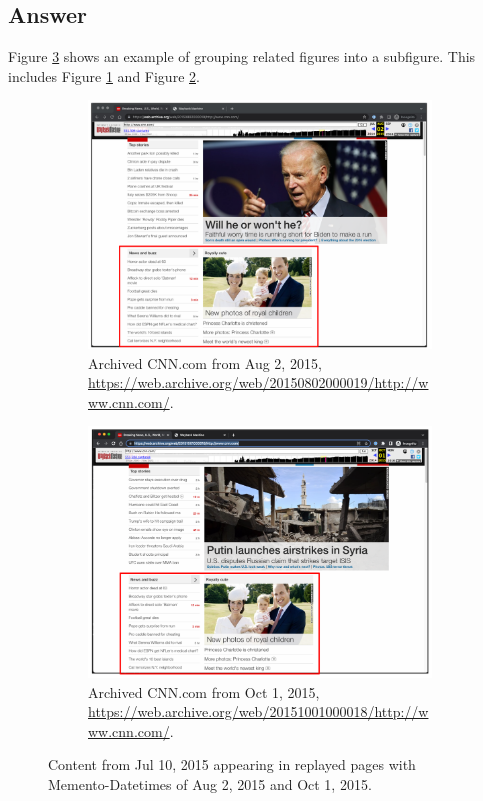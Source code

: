 \documentclass[12pt]{article}
\begin{document}
\subsection*{Answer}

Figure \ref{fig:subfigure-ex} shows an example of grouping related figures into a subfigure.  This includes Figure \ref{fig:cnn-2015aug02} and Figure \ref{fig:cnn-2015oct01}.
\begin{figure}[ht]
\centering
\begin{subfigure}{0.45\textwidth}
  \centering
  \includegraphics[width=0.9\linewidth]{cnn-20150802-IA.png}
  \caption{Archived CNN.com from Aug 2, 2015, \url{https://web.archive.org/web/20150802000019/http://www.cnn.com/}.}
\label{fig:cnn-2015aug02}
\end{subfigure}
\hspace{20pt}
\begin{subfigure}{0.45\textwidth}
  \centering
  \includegraphics[width=0.9\linewidth]{cnn-20151001-IA.png}
  \caption{Archived CNN.com from Oct 1, 2015, \url{https://web.archive.org/web/20151001000018/http://www.cnn.com/}.}
\label{fig:cnn-2015oct01}
\end{subfigure}%
\caption{Content from Jul 10, 2015 appearing in replayed pages with Memento-Datetimes of Aug 2, 2015 and Oct 1, 2015.}
\label{fig:subfigure-ex}
\end{figure}
\end{document}
